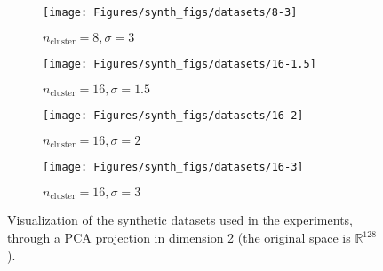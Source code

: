\begin{figure}[ht]
    \begin{subfigure}{0.3\linewidth}
        \centering
        \texttt{[image: Figures/synth\_figs/datasets/8-3]}
        \caption{
            $n_{\textrm{cluster}} = 8, \sigma = 3$
        }
        \label{fig:8-3}
    \end{subfigure}
    \begin{subfigure}{0.3\linewidth}
        \centering
        \texttt{[image: Figures/synth\_figs/datasets/16-1.5]}
        \caption{
            $n_{\textrm{cluster}} = 16, \sigma = 1.5$
        }
        \label{fig:16-1.5}
    \end{subfigure}
    \begin{subfigure}{0.3\linewidth}
        \centering
        \texttt{[image: Figures/synth\_figs/datasets/16-2]}
        \caption{
            $n_{\textrm{cluster}} = 16, \sigma = 2$
        }
        \label{fig:16-2}
    \end{subfigure}
    \begin{subfigure}{0.3\linewidth}
        \centering
        \texttt{[image: Figures/synth\_figs/datasets/16-3]}
        \caption{
            $n_{\textrm{cluster}} = 16, \sigma = 3$
        }
        \label{fig:16-3}
    \end{subfigure}
    \caption{
        Visualization of the synthetic datasets used in the experiments, through a PCA projection in dimension 2 (the original space is $\mathbb{R}^{128}$).
    }
    \label{fig:synth_datasets}
\end{figure}


\FloatBarrier
